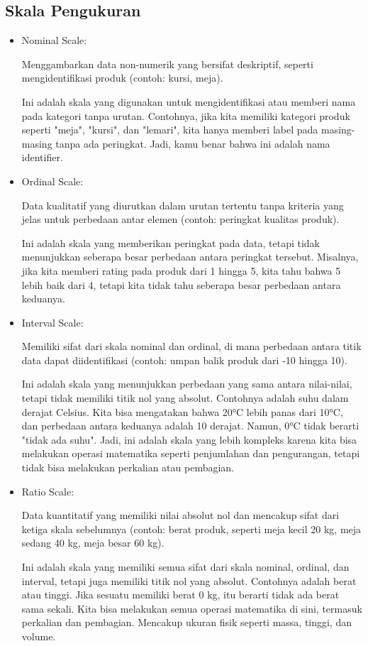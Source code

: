 \documentclass{article}
\begin{document}
\subsection{Skala Pengukuran}
\begin{itemize}
    \item Nominal Scale:

          Menggambarkan data non-numerik yang bersifat deskriptif, seperti mengidentifikasi produk (contoh: kursi, meja).

          Ini adalah skala yang digunakan untuk mengidentifikasi atau memberi nama pada kategori tanpa urutan. Contohnya, jika kita memiliki kategori produk seperti "meja", "kursi", dan "lemari", kita hanya memberi label pada masing-masing tanpa ada peringkat. Jadi, kamu benar bahwa ini adalah nama identifier.

    \item Ordinal Scale:

          Data kualitatif yang diurutkan dalam urutan tertentu tanpa kriteria yang jelas untuk perbedaan antar elemen (contoh: peringkat kualitas produk).

          Ini adalah skala yang memberikan peringkat pada data, tetapi tidak menunjukkan seberapa besar perbedaan antara peringkat tersebut. Misalnya, jika kita memberi rating pada produk dari 1 hingga 5, kita tahu bahwa 5 lebih baik dari 4, tetapi kita tidak tahu seberapa besar perbedaan antara keduanya.

    \item Interval Scale:

          Memiliki sifat dari skala nominal dan ordinal, di mana perbedaan antara titik data dapat diidentifikasi (contoh: umpan balik produk dari -10 hingga 10).

          Ini adalah skala yang menunjukkan perbedaan yang sama antara nilai-nilai, tetapi tidak memiliki titik nol yang absolut. Contohnya adalah suhu dalam derajat Celsius. Kita bisa mengatakan bahwa 20°C lebih panas dari 10°C, dan perbedaan antara keduanya adalah 10 derajat. Namun, 0°C tidak berarti "tidak ada suhu". Jadi, ini adalah skala yang lebih kompleks karena kita bisa melakukan operasi matematika seperti penjumlahan dan pengurangan, tetapi tidak bisa melakukan perkalian atau pembagian.

    \item Ratio Scale:

          Data kuantitatif yang memiliki nilai absolut nol dan mencakup sifat dari ketiga skala sebelumnya (contoh: berat produk, seperti meja kecil 20 kg, meja sedang 40 kg, meja besar 60 kg).

          Ini adalah skala yang memiliki semua sifat dari skala nominal, ordinal, dan interval, tetapi juga memiliki titik nol yang absolut. Contohnya adalah berat atau tinggi. Jika sesuatu memiliki berat 0 kg, itu berarti tidak ada berat sama sekali. Kita bisa melakukan semua operasi matematika di sini, termasuk perkalian dan pembagian. Mencakup ukuran fisik seperti massa, tinggi, dan volume.
\end{itemize}
\end{document}
